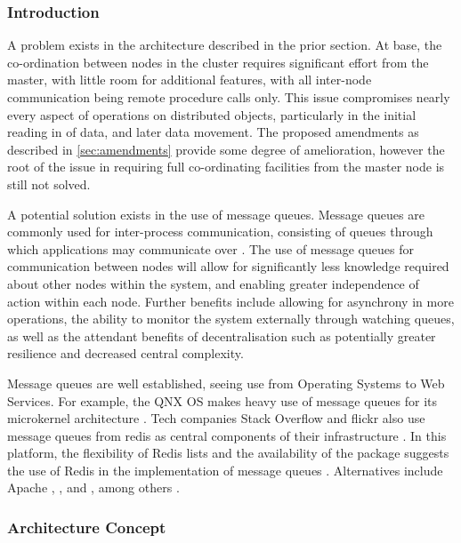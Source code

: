 \subsubsection{Introduction}\label{subsubsec:cmq-introduction}

A problem exists in the architecture described in the prior section.
At base, the co-ordination between nodes in the
cluster requires significant effort from the master, with little room
for additional features, with all inter-node communication being remote
procedure calls only. This issue compromises nearly every aspect of
operations on distributed objects, particularly in the initial reading
in of data, and later data movement. The proposed amendments as
described in \cref{sec:amendments} provide some degree of amelioration, however the
root of the issue in requiring full co-ordinating facilities from the
master node is still not solved.

A potential solution exists in the use of message queues. Message queues
are commonly used for inter-process communication, consisting of queues
through which applications may communicate over \cite{curry2004message}.
The use of message queues for communication between nodes will allow for
significantly less knowledge required about other nodes within the
system, and enabling greater independence of action within each node.
Further benefits include allowing for asynchrony in more operations, the
ability to monitor the system externally through watching queues, as
well as the attendant benefits of decentralisation such as potentially
greater resilience and decreased central complexity.

Message queues are well established, seeing use from Operating Systems
to Web Services. For example, the QNX OS makes heavy use of message
queues for its microkernel architecture \cite{hildebrand1992qnx}. Tech
companies Stack Overflow and flickr also use message queues from redis
as central components of their infrastructure \cites{nolan2011flickr,montrose2016stack}. In this platform, the flexibility of Redis lists
and the availability of the  package suggests the use of Redis in
the implementation of message queues \cite{sanfilippo2009redis,urbanek2020rediscc}. Alternatives include Apache , , and
, among others \cites{snyder2011activemq,garg2013kafka,sanfilippo2016disque}.

\subsubsection{Architecture Concept}\label{architecture-concept}

